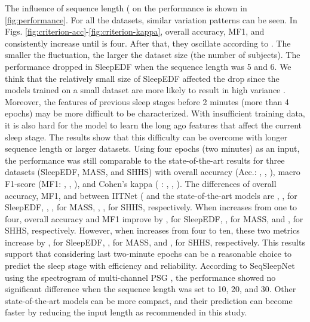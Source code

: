 \documentclass[10pt,twocolumn,twoside]{IEEEtran}
\begin{document}
    The influence of sequence length ( on the performance is shown in \ref{fig:performance}. For all the datasets, similar variation patterns can be seen. In Figs. \ref{fig:criterion-acc}-\ref{fig:criterion-kappa}, overall accuracy, MF1, and  consistently increase until  is four. After that, they oscillate according to . The smaller the fluctuation, the larger the dataset size (the number of subjects). The performance dropped in SleepEDF when the sequence length was 5 and 6. We think that the relatively small size of SleepEDF affected the drop since the models trained on a small dataset are more likely to result in high variance \cite{brain1999effect}. Moreover, the features of previous sleep stages before 2 minutes (more than 4 epochs) may be more difficult to be characterized. With insufficient training data, it is also hard for the model to learn the long ago features that affect the current sleep stage. The results show that this difficulty can be overcome with longer sequence length or larger datasets. Using four epochs (two minutes) as an input, the performance was still comparable to the state-of-the-art results for three datasets (SleepEDF, MASS, and SHHS) with overall accuracy (Acc.: , , ), macro F1-score (MF1: , , ), and Cohen's kappa ( : , , ).  The differences of overall accuracy, MF1, and  between IITNet ( and the state-of-the-art models are , ,  for SleepEDF, , ,  for MASS, , ,  for SHHS, respectively. When  increases from one to four, overall accuracy and MF1 improve by ,  for SleepEDF, ,  for MASS, and ,  for SHHS, respectively. However, when  increases from four to ten, these two metrics increase by ,  for SleepEDF, ,  for MASS, and ,  for SHHS, respectively. This results support that considering last two-minute epochs can be a reasonable choice to predict the sleep stage with efficiency and reliability. According to SeqSleepNet using the spectrogram of multi-channel PSG \cite{phan2019seqsleepnet}, the performance showed no significant difference when the sequence length was set to 10, 20, and 30. Other state-of-the-art models can be more compact, and their prediction can become faster by reducing the input length as recommended in this study.  
    
\end{document}
